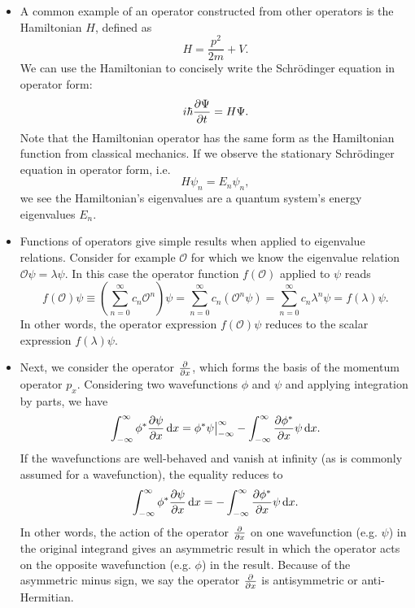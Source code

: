 \documentclass[11pt, a4paper]{article}
\newcommand{\diff}{\mathop{}\!\mathrm{d}} %
\newcommand{\Schro}{Schr\"{o}dinger\xspace}
\renewcommand{\O}{\mathcal{O}}  %
\newcommand{\p}{\psi}  %
\renewcommand{\P}{\Psi}  %
\begin{document}
\begin{itemize}
	
	
	\item A common example of an operator constructed from other operators is the Hamiltonian $ H $, defined as
	\begin{equation*}
		H = \frac{p^{2}}{2m} + V.
	\end{equation*}
	We can use the Hamiltonian to concisely write the \Schro equation in operator form:
	\begin{equation*}
		i\hbar \pdv{\P}{t} = H\P.
	\end{equation*}
	Note that the Hamiltonian operator has the same form as the Hamiltonian function from classical mechanics. If we observe the stationary \Schro equation in operator form, i.e.
	\begin{equation*}
		H \p_{n} = E_{n}\p_{n},
	\end{equation*}
	we see the Hamiltonian's eigenvalues are a quantum system's energy eigenvalues $ E_{n} $.
	
	\item Functions of operators give simple results when applied to eigenvalue relations. Consider for example $ \O $ for which we know the eigenvalue relation $ \O \p =  \lambda \p $. In this case the operator function $ f(\O) $ applied to $ \p $ reads
	\begin{equation*}
		f(\O) \psi \equiv \left(\sum_{n = 0}^{\infty}c_{n} \O^{n}\right)\p = \sum_{n=0}^{\infty}c_{n} \left(\O^{n} \p\right) =  \sum_{n=0}^{\infty}c_{n} \lambda^{n} \p = f(\lambda) \p.
	\end{equation*}
	In other words, the operator expression $ f(\O) \psi $ reduces to the scalar expression $ f(\lambda) \p $. 
	
	\item Next, we consider the operator $ \pdv{x} $, which forms the basis of the momentum operator $ p_{x} $. Considering two wavefunctions $ \phi $ and $ \p $ and applying integration by parts, we have
	\begin{equation*}
		\int_{-\infty}^{\infty} \phi^{*} \pdv{\p}{x} \diff x = \phi^{*}\p \big |_{-\infty}^{\infty} - \int_{-\infty}^{\infty} \pdv{\phi^{*}}{x} \p  \diff x.
	\end{equation*}
	If the wavefunctions are well-behaved and vanish at infinity (as is commonly assumed for a wavefunction), the equality reduces to
	\begin{equation*}
		\int_{-\infty}^{\infty} \phi^{*} \pdv{\p}{x} \diff x = -\int_{-\infty}^{\infty} \pdv{\phi^{*}}{x} \p \diff x.
	\end{equation*}
	In other words, the action of the operator $ \pdv{x} $ on one wavefunction (e.g. $ \psi $) in the original integrand gives an asymmetric result in which the operator acts on the opposite wavefunction (e.g. $ \phi $) in the result. Because of the asymmetric minus sign, we say the operator $ \pdv{x} $ is antisymmetric or anti-Hermitian.
	

\end{itemize}
\end{document}
